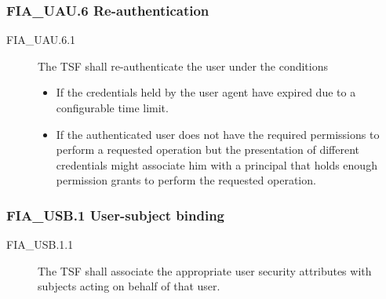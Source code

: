 \documentclass[10pt,a4paper,english]{article}
\begin{document}

\hypertarget{fia-uau-6-re-authentication}{}
\subsubsection*{FIA{\_}UAU.6 Re-authentication}
\begin{description}
\item[FIA{\_}UAU.6.1 ]

The TSF shall re-authenticate the user under the conditions
\begin{itemize}
\item {} 
If the credentials held by the user agent have expired due to
a configurable time limit.

\item {} 
If the authenticated user does not have the required permissions to
perform a requested operation but the presentation of different
credentials might associate him with a principal that holds enough
permission grants to perform the requested operation.

\end{itemize}

\end{description}



\hypertarget{fia-usb-1-user-subject-binding}{}
\subsubsection*{FIA{\_}USB.1 User-subject binding}
\begin{description}
\item[FIA{\_}USB.1.1]

The TSF shall associate the appropriate user security
attributes with subjects acting on behalf of that user.

\end{description}


\end{document}
